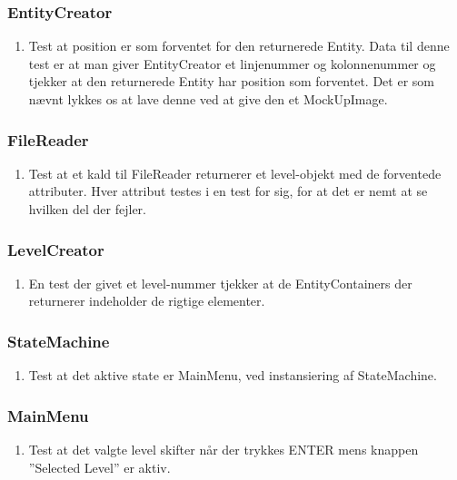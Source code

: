    \subsubsection{EntityCreator}
      \begin{enumerate}
         \item Test at position er som forventet for den returnerede Entity. Data til denne test er at man giver EntityCreator et linjenummer og kolonnenummer og tjekker at den returnerede Entity har position som forventet. Det er som nævnt lykkes os at lave denne ved at give den et MockUpImage. 
      \end{enumerate}
   \subsubsection{FileReader}
      \begin{enumerate}
         \item Test at et kald til FileReader returnerer et level-objekt med de forventede attributer. Hver attribut testes i en test for sig, for at det er nemt at se hvilken del der fejler.
      \end{enumerate}
   \subsubsection{LevelCreator}
      \begin{enumerate}
         \item En test der givet et level-nummer tjekker at de EntityContainers der returnerer indeholder de rigtige elementer.
      \end{enumerate}
   \subsubsection{StateMachine}
      \begin{enumerate}
         \item Test at det aktive state er MainMenu, ved instansiering af StateMachine.
      \end{enumerate}
   \subsubsection{MainMenu}
      \begin{enumerate}
         \item Test at det valgte level skifter når der trykkes ENTER mens knappen ''Selected Level'' er aktiv.
      \end{enumerate}
